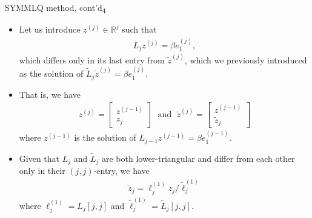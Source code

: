 \documentclass[t,usepdftitle=false]{beamer}
\begin{document}
\begin{frame}{SYMMLQ method, cont'd\textsubscript{4}}
\begin{itemize}
\item Let us introduce $z^{(j)}\in\mathbb{R}^j$ such that
\begin{align*}
L_jz^{(j)}=\beta e_1^{(j)},
\end{align*}
which differs only in its last entry from $\tilde{z}^{(j)}$, which we previously introduced as the solution of $\tilde{L}_j\tilde{z}^{(j)}=\beta e_1^{(j)}$.
\item[] That is, we have
\begin{align*}
z^{(j)}=\begin{bmatrix}z^{(j-1)}\\z_j\end{bmatrix}
\;\text{ and }\;
\tilde{z}^{(j)}=\begin{bmatrix}z^{(j-1)}\\\tilde{z}_j\end{bmatrix}
\end{align*}
where $z^{(j-1)}$ is the solution of $L_{j-1}z^{(j-1)}=\beta e_1^{(j-1)}$.
\item[] Given that $L_j$ and $\tilde{L}_j$ are both lower-triangular and differ from each other only in their $(j,j)$-entry, we have 
\begin{align*}
\tilde{z}_j=\ell_j^{(1)}z_j/\tilde{\ell}^{(1)}_j
\end{align*}
where $\ell^{(1)}_j=L_j[j,j]$ and $\tilde{\ell}^{(1)}_j=\tilde{L}_j[j,j]$.
\end{itemize}
\end{frame}
\end{document}
